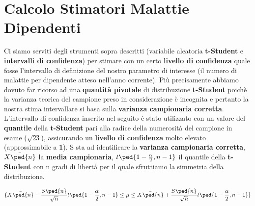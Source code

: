   \chapter{Calcolo Stimatori Malattie Dipendenti}
	Ci siamo serviti degli strumenti sopra descritti (variabile aleatoria \textbf{t-Student} e \textbf{intervalli di confidenza}) per stimare con un certo \textbf{livello di confidenza} quale fosse l'intervallo di definizione del nostro parametro di interesse (il numero di malattie per dipendente atteso nell'anno corrente). Più precisamente abbiamo dovuto far ricorso ad una \textbf{quantità pivotale} di distribuzione \textbf{t-Student} poichè la varianza teorica del campione preso in considerazione è incognita e pertanto la nostra stima intervallare si basa sulla \textbf{varianza campionaria corretta}. L'intervallo di confidenza inserito nel seguito è stato utilizzato con un valore del \textbf{quantile} della \textbf{t-Student} pari alla radice della numerosità del campione in esame ($\sqrt{23}$), assicurando un \textbf{livello di confidenza} molto elevato (approssimabile a \textbf{1}). S sta ad identificare la \textbf{varianza campionaria corretta}, $\bar{X\ped{n}}$ la \textbf{media campionaria}, $t\ped{1-\frac{\alpha}{2},n-1}$ il quantile della \textbf{t-Student} con n gradi di libertà per il quale sfruttiamo la simmetria della distribuzione.

\[
\{\bar{X\ped{n}} - \frac{S\ped{n}}{\sqrt{n}}t\ped{1-\frac{\alpha}{2},n-1} \leq \mu \leq \bar{X\ped{n}} + \frac{S\ped{n}}{\sqrt{n}}t\ped{1-\frac{\alpha}{2},n-1}\}
\]

